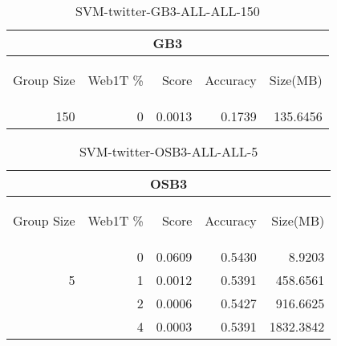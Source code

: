 \begin{center}
\begin{table}[htbp] 
 \begin{center}
\begin{tabular}{ | r | r | r | r | r |}
\hline
\multicolumn{5}{|c|}{GB3}\\
\hline
\begin{sideways}Group Size\end{sideways} & \begin{sideways}Web1T \%\end{sideways} & \begin{sideways}Score\end{sideways} & \begin{sideways}Accuracy\end{sideways} & \begin{sideways}Size(MB)\end{sideways}\\
\hline
\multirow{0}{*}{150}
 & 0 & 0.0013 & 0.1739 & 135.6456\\ \cline{2-5}
\hline
\end{tabular}
\caption{SVM-twitter-GB3-ALL-ALL-150}
\label{table:SVM-twitter-GB3-ALL-ALL-150}
\end{center}
 \end{table}
\end{center}

\begin{center}
\begin{table}[htbp] 
 \begin{center}
\begin{tabular}{ | r | r | r | r | r |}
\hline
\multicolumn{5}{|c|}{OSB3}\\
\hline
\begin{sideways}Group Size\end{sideways} & \begin{sideways}Web1T \%\end{sideways} & \begin{sideways}Score\end{sideways} & \begin{sideways}Accuracy\end{sideways} & \begin{sideways}Size(MB)\end{sideways}\\
\hline
\multirow{3}{*}{5}
 & 0 & 0.0609 & 0.5430 & 8.9203\\ \cline{2-5}
 & 1 & 0.0012 & 0.5391 & 458.6561\\ \cline{2-5}
 & 2 & 0.0006 & 0.5427 & 916.6625\\ \cline{2-5}
 & 4 & 0.0003 & 0.5391 & 1832.3842\\ \cline{2-5}
\hline
\end{tabular}
\caption{SVM-twitter-OSB3-ALL-ALL-5}
\label{table:SVM-twitter-OSB3-ALL-ALL-5}
\end{center}
 \end{table}
\end{center}

